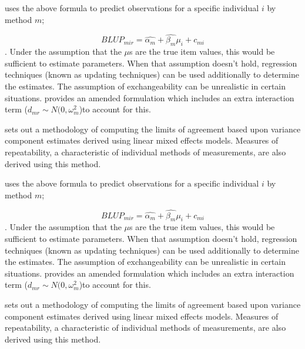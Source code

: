 \documentclass{report}
\begin{document}

\citet{BXC2004} uses the above formula to predict observations for
a specific individual $i$ by method $m$;

\begin{equation}BLUP_{mir} = \hat{\alpha_{m}} + \hat{\beta_{m}}\mu_{i} +
	c_{mi} \end{equation}. Under the assumption that the $\mu$s are
the true item values, this would be sufficient to estimate
parameters. When that assumption doesn't hold, regression
techniques (known as updating techniques) can be used additionally
to determine the estimates. The assumption of exchangeability can
be unrealistic in certain situations. \citet{BXC2004} provides an
amended formulation which includes an extra interaction term ($
d_{mr} \sim N(0,\omega^{2}_{m}$)to account for this.


\newpage
\citet{BXC2008} sets out a methodology of computing the limits of
agreement based upon variance component estimates derived using
linear mixed effects models. Measures of repeatability, a
characteristic of individual methods of measurements, are also
derived using this method.




\citet{BXC2004} uses the above formula to predict observations for
a specific individual $i$ by method $m$;

\begin{equation}BLUP_{mir} = \hat{\alpha_{m}} + \hat{\beta_{m}}\mu_{i} +
	c_{mi} \end{equation}. Under the assumption that the $\mu$s are
the true item values, this would be sufficient to estimate
parameters. When that assumption doesn't hold, regression
techniques (known as updating techniques) can be used additionally
to determine the estimates. The assumption of exchangeability can
be unrealistic in certain situations. \citet{BXC2004} provides an
amended formulation which includes an extra interaction term ($
d_{mr} \sim N(0,\omega^{2}_{m}$)to account for this.


\newpage
\citet{BXC2008} sets out a methodology of computing the limits of
agreement based upon variance component estimates derived using
linear mixed effects models. Measures of repeatability, a
characteristic of individual methods of measurements, are also
derived using this method.
\end{document}

